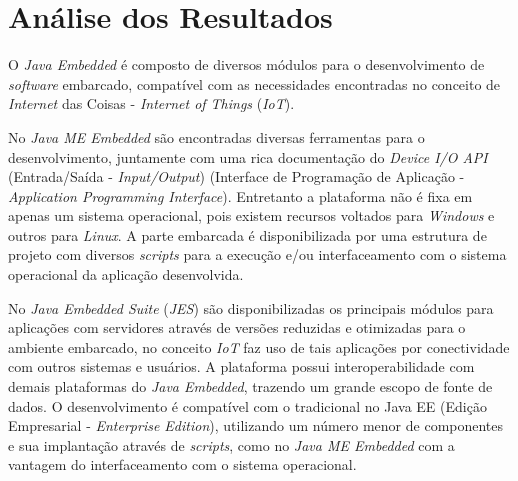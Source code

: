 %


\chapter{Análise dos Resultados}

O \textit{Java Embedded} é composto de diversos módulos para o desenvolvimento
de \textit{software} embarcado, compatível com as necessidades encontradas no
conceito de \textit{Internet} das Coisas - \textit{Internet of Things}
(\textit{IoT}).

No \textit{Java ME Embedded} são encontradas diversas ferramentas para o
desenvolvimento, juntamente com uma rica documentação do \textit{Device I/O
  API} (Entrada/Saída - \textit{Input/Output}) (Interface de Programação de
Aplicação - \textit{Application Programming Interface}). Entretanto a
plataforma não é fixa em apenas um sistema operacional, pois existem recursos
voltados para \textit{Windows} e outros para \textit{Linux}. A parte embarcada
é disponibilizada por uma estrutura de projeto com diversos \textit{scripts}
para a execução e/ou interfaceamento com o sistema operacional da aplicação
desenvolvida.

No \textit{Java Embedded Suite} (\textit{JES}) são disponibilizadas os
principais módulos para aplicações com servidores através de versões reduzidas
e otimizadas para o ambiente embarcado, no conceito \textit{IoT} faz uso de
tais aplicações por conectividade com outros sistemas e usuários. A plataforma
possui interoperabilidade com demais plataformas do \textit{Java Embedded},
trazendo um grande escopo de fonte de dados. O desenvolvimento é compatível com
o tradicional no Java EE (Edição Empresarial - \textit{Enterprise Edition}),
utilizando um número menor de componentes e sua implantação através de
\textit{scripts}, como no \textit{Java ME Embedded} com a vantagem do
interfaceamento com o sistema operacional.
